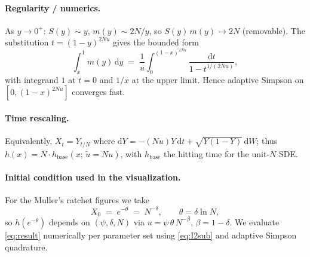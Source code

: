 \documentclass[11pt]{article}
\begin{document}
\paragraph{Regularity / numerics.}
As $y\to 0^+$: $S(y)\sim y$, $m(y)\sim 2N/y$, so $S(y)\,m(y)\to 2N$
(removable). The substitution $t=(1-y)^{2N{u}}$ gives the bounded form
\begin{equation}\label{eq:I2sub}
  \int_x^1 m(y)\,\mathrm{d}y
  \;=\;
  \frac{1}{{u}}\int_0^{(1-x)^{2N{u}}}\!\!\frac{\mathrm{d}t}{1 - t^{1/(2N{u})}},
\end{equation}
with integrand $1$ at $t=0$ and $1/x$ at the upper limit. Hence adaptive
Simpson on $[0,(1-x)^{2N{u}}]$ converges fast.

\paragraph{Time rescaling.}
Equivalently, $X_t = Y_{t/N}$ where
$\mathrm{d}Y = -(N{u}) Y\,\mathrm{d}t + \sqrt{Y(1-Y)}\,\mathrm{d}W$;
thus $h(x) = N \cdot h_{\mathrm{base}}(x;\,\widetilde{u} = N{u})$,
with $h_{\mathrm{base}}$ the hitting time for the unit-$N$ SDE.

\paragraph{Initial condition used in the visualization.} For the Muller's
ratchet figures we take
\[
  X_0 \;=\; e^{-\theta} \;=\; N^{-\delta},
  \qquad \theta = \delta \ln N,
\]
so $h(e^{-\theta})$ depends on $(\psi, \delta, N)$ via
${u} = \psi\,\theta\,N^{-\beta}$, $\beta = 1-\delta$.
We evaluate \eqref{eq:result} numerically per parameter set using
\eqref{eq:I2sub} and adaptive Simpson quadrature.
\end{document}

